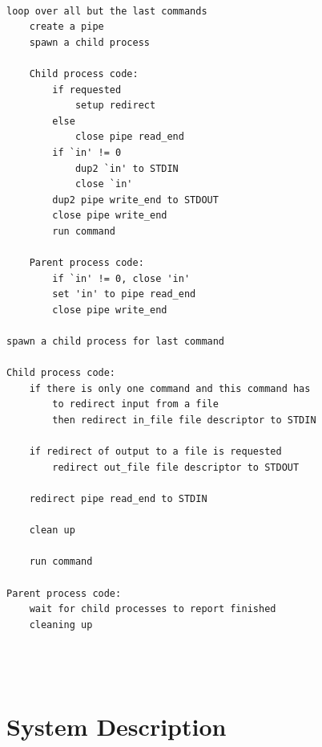 \documentclass[a4paper,11pt,twoside]{article}
\begin{document}
\begin{verbatim}

loop over all but the last commands 
    create a pipe
    spawn a child process

    Child process code:
        if requested 
            setup redirect
        else
            close pipe read_end
        if `in' != 0
            dup2 `in' to STDIN
            close `in'
        dup2 pipe write_end to STDOUT
        close pipe write_end
        run command

    Parent process code:
        if `in' != 0, close 'in'
        set 'in' to pipe read_end 
        close pipe write_end

spawn a child process for last command

Child process code:
    if there is only one command and this command has 
        to redirect input from a file
        then redirect in_file file descriptor to STDIN

    if redirect of output to a file is requested
        redirect out_file file descriptor to STDOUT

    redirect pipe read_end to STDIN

    clean up

    run command

Parent process code:
    wait for child processes to report finished
    cleaning up

 


\end{verbatim}


\section{System Description}
\end{document}
